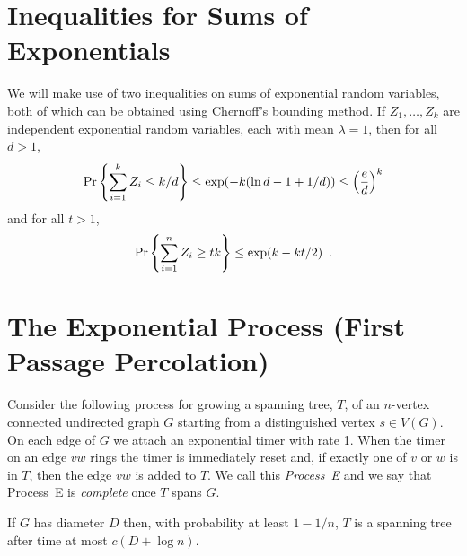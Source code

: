 \documentclass{patmorin}
\begin{document}
\section{Inequalities for Sums of Exponentials}

We will make use of two inequalities on sums of exponential random
variables, both of which can be obtained using Chernoff's bounding method.
If $Z_1,\ldots,Z_k$ are independent exponential random variables, each
with mean $\lambda=1$, then for all $d>1$,
\begin{equation}
    \Pr\left\{\sum_{i=1}^k Z_i \le k/d\right\} \le \exp(-k(\ln d -1 + 1/d)) \le \left(\frac{e}{d}\right)^k  \eqlabel{head-bound}
\end{equation}
and for all $t>1$, 
\begin{equation}
    \Pr\left\{\sum_{i=1}^n Z_i \ge tk\right\} \le \exp (k- k t/2) \enspace . \eqlabel{tail-bound}
\end{equation}


\section{The Exponential Process (First Passage Percolation)}

Consider the following process for growing a spanning tree, $T$, of an
$n$-vertex connected undirected graph $G$ starting from a distinguished
vertex $s\in V(G)$.  On each edge of $G$ we attach an exponential timer
with rate 1. When the timer on an edge $vw$ rings the timer is immediately
reset and, if exactly one of $v$ or $w$ is in $T$, then the edge $vw$
is added to $T$.  We call this \emph{Process~E} and we say that Process~E
is \emph{complete} once $T$ spans $G$.

\begin{lem}
  If $G$ has diameter $D$ then, with probability at least $1-1/n$, $T$
  is a spanning tree after time at most $c(D+\log n)$.
\end{lem}
\end{document}
